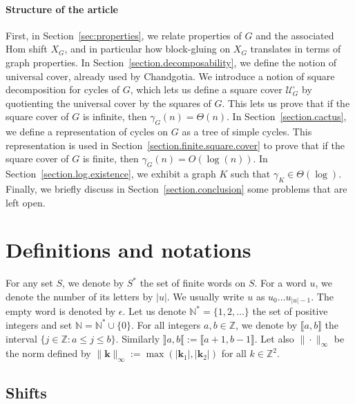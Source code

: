 \documentclass{article}
\newcommand\quadcover[1]{\mathcal{U}^\square_{#1}}
\begin{document}
\paragraph*{Structure of the article}
First, in Section~\ref{sec:properties}, we relate properties of $G$ and the associated Hom shift $X_G$, and in particular how block-gluing on $X_G$ translates in terms of graph properties. In Section~\ref{section.decomposability}, we define the notion of universal cover, already used by Chandgotia. We introduce a notion of square decomposition for cycles of $G$, which lets us define a square cover $\quadcover{G}$ by quotienting the universal cover by the squares of $G$. This lets us prove that if the square cover of $G$ is infinite, then $\gamma_G (n) = \Theta(n)$. In Section~\ref{section.cactus}, we define a representation of cycles on $G$ as a tree of simple cycles. This representation is used in Section~\ref{section.finite.square.cover} to prove that if the square cover of $G$ is finite, then  $\gamma_G (n) = O(\log(n))$. In Section~\ref{section.log.existence}, we exhibit a graph $K$ such that $\gamma_K \in \Theta(\log)$. Finally, we briefly discuss in Section~\ref{section.conclusion} some problems that are left open.


\section{Definitions and notations\label{section.definitions}}

For any set $S$, we denote by $S^{*}$ the set of finite words on $S$. For a word $u$, we denote the number of its letters by $|u|$. We usually write $u$ as $u_0 \hdots u_{|u|-1}$. The empty word is denoted by $\epsilon$. Let us denote $\mathbb{N}^{*} = \{1, 2, \dots \}$ the set of positive integers and set
$\mathbb{N}=\mathbb{N}^{*} \cup \{0\}$. For all integers $a,b \in \mathbb{Z}$, we denote by $\llbracket a , b \rrbracket$ the interval $\{j \in \mathbb{Z} : a \le j \le b \}$. Similarly $\rrbracket a , b \llbracket:=\llbracket a+1 , b-1 \rrbracket$. Let also $\|\cdot\|_{\infty}$ be the norm defined by $\|\textbf{k}\|_{\infty} := \max(|\textbf{k}_1|,|\textbf{k}_2|)$ for all $k\in\mathbb Z^2$.

\subsection{Shifts}
\end{document}
